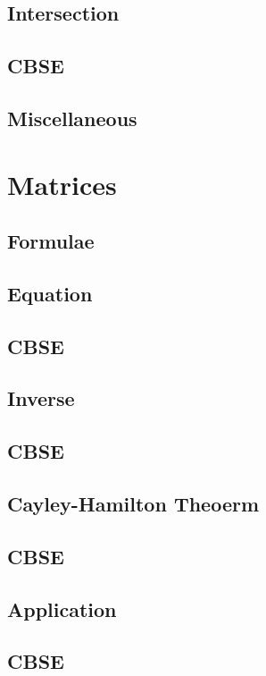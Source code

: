\documentclass[journal]{IEEEtran}
\begin{document}
\subsection{Intersection}

\subsection{CBSE}

\subsection{Miscellaneous }

\newpage
\section{Matrices}
\subsection{Formulae}

\subsection{Equation}

\subsection{CBSE}

\subsection{Inverse}

\subsection{CBSE}

\subsection{Cayley-Hamilton Theoerm}

\subsection{CBSE}

\subsection{Application}

\subsection{CBSE}

\end{document}
